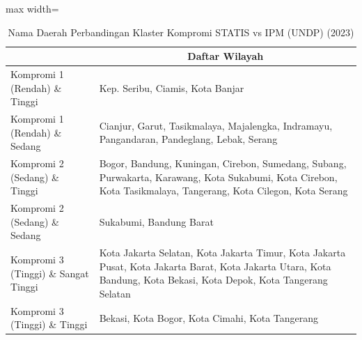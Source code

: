 \begin{table}[H]
\centering
\caption{Nama Daerah Perbandingan Klaster Kompromi STATIS vs IPM (UNDP) (2023)} \label{tab:app1comp_ipm_name_2023}
\begin{adjustbox}{max width=\textwidth}
\begin{tabular}{|>{\centering\arraybackslash}p{4cm}|p{10cm}|}
\hline
\multicolumn{1}{|c|}{\textbf{Kategori}} & \multicolumn{1}{c|}{\textbf{Daftar Wilayah}} \\
\hline
Kompromi 1 (Rendah) \& Tinggi & Kep. Seribu, Ciamis, Kota Banjar \\
\hline
Kompromi 1 (Rendah) \& Sedang & Cianjur, Garut, Tasikmalaya, Majalengka, Indramayu, Pangandaran, Pandeglang, Lebak, Serang \\
\hline
Kompromi 2 (Sedang) \& Tinggi & Bogor, Bandung, Kuningan, Cirebon, Sumedang, Subang, Purwakarta, Karawang, Kota Sukabumi, Kota Cirebon, Kota Tasikmalaya, Tangerang, Kota Cilegon, Kota Serang \\
\hline
Kompromi 2 (Sedang) \& Sedang & Sukabumi, Bandung Barat \\
\hline
Kompromi 3 (Tinggi) \& Sangat Tinggi & Kota Jakarta Selatan, Kota Jakarta Timur, Kota Jakarta Pusat, Kota Jakarta Barat, Kota Jakarta Utara, Kota Bandung, Kota Bekasi, Kota Depok, Kota Tangerang Selatan \\
\hline
Kompromi 3 (Tinggi) \& Tinggi & Bekasi, Kota Bogor, Kota Cimahi, Kota Tangerang \\
\hline
\end{tabular}
\end{adjustbox}
\end{table}